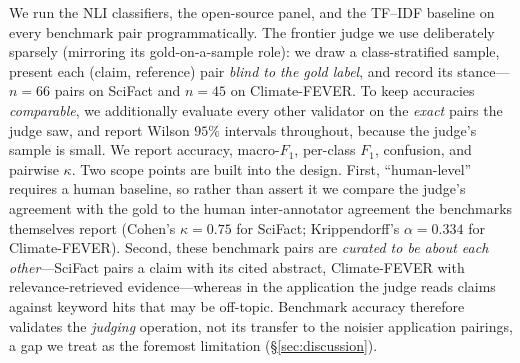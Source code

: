 We run the NLI classifiers, the open-source panel, and the TF--IDF baseline on every benchmark pair
programmatically. The frontier judge we use deliberately sparsely (mirroring its gold-on-a-sample
role): we draw a class-stratified sample, present each (claim, reference) pair \emph{blind to the gold
label}, and record its stance---$n=66$ pairs on SciFact and $n=45$ on Climate-FEVER. To keep accuracies
\emph{comparable}, we additionally evaluate every other validator on the \emph{exact} pairs the judge
saw, and report Wilson $95\%$ intervals throughout, because the judge's sample is small. We report
accuracy, macro-$F_1$, per-class $F_1$, confusion, and pairwise $\kappa$. Two scope points are built into
the design. First, ``human-level'' requires a human baseline, so rather than assert it we compare the
judge's agreement with the gold to the human inter-annotator agreement the benchmarks themselves report
(Cohen's $\kappa=0.75$ for SciFact; Krippendorff's $\alpha=0.334$ for Climate-FEVER). Second, these
benchmark pairs are \emph{curated to be about each other}---SciFact pairs a claim with its cited
abstract, Climate-FEVER with relevance-retrieved evidence---whereas in the application the judge reads
claims against keyword hits that may be off-topic. Benchmark accuracy therefore validates the
\emph{judging} operation, not its transfer to the noisier application pairings, a gap we treat as the
foremost limitation (\S\ref{sec:discussion}).

